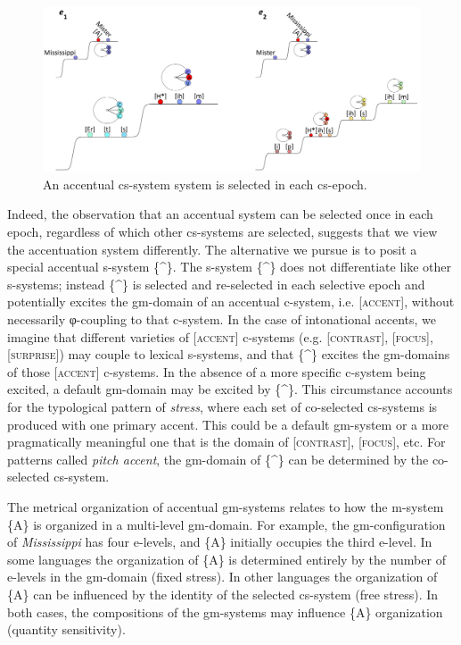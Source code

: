   
\begin{figure}
\includegraphics[width=\textwidth]{figures/Tilsen-img63.png}
\caption{An accentual cs-system system is selected in each cs-epoch.}
\label{fig:4:13}
\end{figure}
 

  Indeed, the observation that an accentual system can be selected once in each epoch, regardless of which other cs-systems are selected, suggests that we view the accentuation system differently. The alternative we pursue is to posit a special accentual s-system \{\^{}\}. The s-system \{\^{}\} does not differentiate like other s-systems; instead \{\^{}\} is selected and re-selected in each selective epoch and potentially excites the gm-domain of an accentual c-system, i.e. [\textsc{accent}], without necessarily φ-coupling to that c-system. In the case of intonational accents, we imagine that different varieties of [\textsc{accent}] c-systems (e.g. [\textsc{contrast}], [\textsc{focus}], [\textsc{surprise}]) may couple to lexical s-systems, and that \{\^{}\} excites the gm-domains of those [\textsc{accent}] c-systems. In the absence of a more specific c-system being excited, a default gm-domain may be excited by \{\^{}\}. This circumstance accounts for the typological pattern of \textit{stress}, where each set of co-selected cs-systems is produced with one primary accent. This could be a default gm-system or a more pragmatically meaningful one that is the domain of [\textsc{contrast}], [\textsc{focus}], etc. For patterns called \textit{pitch accent}, the gm-domain of \{\^{}\} can be determined by the co-selected cs-system.

  The metrical organization of accentual gm-systems relates to how the m-system \{A\} is organized in a multi-level gm-domain. For example, the gm-configuration of \textit{Mississippi} has four e-levels, and \{A\} initially occupies the third e-level. In some languages the organization of \{A\} is determined entirely by the number of e-levels in the gm-domain (fixed stress). In other languages the organization of \{A\} can be influenced by the identity of the selected cs-system (free stress). In both cases, the compositions of the gm-systems may influence \{A\} organization (quantity sensitivity). 

